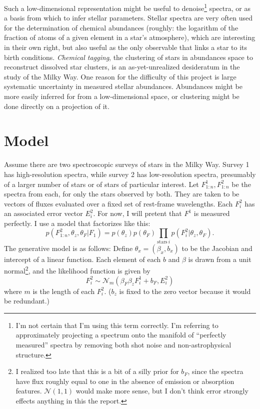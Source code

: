 \documentclass[12pt]{article}
\begin{document}
Such a low-dimensional representation might be useful to denoise\footnote{I'm not certain that I'm using this term correctly.  I'm referring to approximately projecting a spectrum onto the manifold of ``perfectly measured'' spectra by removing both shot noise and non-astrophysical structure.}
spectra, or as a basis from which to infer stellar parameters.
Stellar spectra are very often used for the determination of chemical abundances (roughly: the logarithm of the fraction of atoms of a given element in a star's atmosphere), which are interesting in their own right, but also useful as the only observable that links a star to its birth conditions.
\emph{Chemical tagging}, the clustering of stars in abundances space to reconstruct dissolved star clusters, is an as-yet-unrealized desideratum in the study of the Milky Way.
One reason for the difficulty of this project is large systematic uncertainty in measured stellar abundances.
Abundances might be more easily inferred for from a low-dimensional space, or clustering might be done directly on a projection of it.

\section{Model}
Assume there are two spectroscopic surveys of stars in the Milky Way.
Survey 1 has high-resolution spectra, while survey 2 has low-resolution spectra, presumably of a larger number of stars or of stars of particular interest.
Let $F^1_{1:n}, F^2_{1:n}$ be the spectra from each, for only the stars observed by both.
They are taken to be vectors of fluxes evaluated over a fixed set of rest-frame wavelengths.
Each $F^2_i$ has an associated error vector $E^2_i$.
For now, I will pretent that $F^1$ is measured perfectly.
I use a model that factorizes like this:
\begin{equation}
    p(F^2_{1:n}, \theta_z, \theta_F| F_1) = p(\theta_z) p(\theta_F) \prod_{\mathrm{stars}~i}  p(F^2_i | \theta_z, \theta_F).
\end{equation}
The generative model is as follows: Define $\theta_x = (\beta_x, b_x)$ to be the Jacobian and intercept of a linear function.
Each element of each $b$ and $\beta$ is drawn from a unit normal\footnote{I realized too late that this is a bit of a silly prior for $b_F$, since the spectra have flux roughly equal to one in the absence of emission or absorption features.  $\mathcal{N}(1, 1)$ would make more sense, but I don't think error strongly effects anything in this the report.}, and the likelihood function is given by
\begin{equation}
    F^2_i \sim \mathcal{N}_m(\beta_F \beta_z F^1_i + b_F, E^2_i)
\end{equation}
where $m$ is the length of each $F^2_i$.
($b_z$ is fixed to the zero vector because it would be redundant.)
\end{document}
